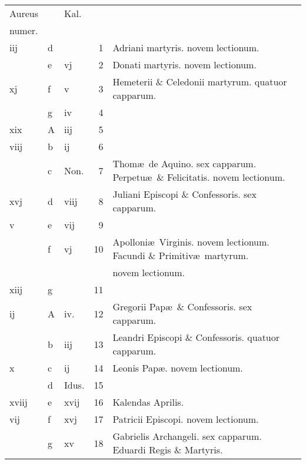 \documentclass[letter,11pt]{book}
\begin{document}
\begin{center}
\begin{tabular}{l | l | l | r | l}
\color{Red}Aureus & & \color{Red} Kal. & \\
\color{Red}numer. & & & \\
\color{Red} iij & d & & 1 & Adriani martyris. \color{Red} novem lectionum. \\
\color{Red}  & e & \color{Red} vj & 2 & Donati martyris. \color{Red} novem lectionum. \\
\color{Red} xj & f & \color{Red} v & 3 & Hemeterii \& Celedonii martyrum. \color{Red} quatuor capparum. \\
\color{Red}  & g & \color{Red} iv & 4 & \\
\color{Red} xix & \color{Red} A & \color{Red} iij & 5 & \\
\color{Red} viij & b & \color{Red} ij & 6 & \\
\color{Red}  & c & Non. & 7 & Thom\ae \ de Aquino. \color{Red} sex capparum. \color{black} Perpetu\ae \ \& Felicitatis. \color{Red} novem lectionum. \\
\color{Red} xvj & d & \color{Red} viij & 8 & Juliani Episcopi \& Confessoris. \color{Red} sex capparum. \\
\color{Red} v & e & \color{Red} vij & 9 & \\
\color{Red}  & f & \color{Red} vj & 10 & Apolloni\ae \ Virginis. \color{Red} novem lectionum. \color{black} Facundi \& Primitiv\ae \ martyrum. \\
 &  &  &  & \quad \color{Red} novem lectionum. \\
\color{Red} xiij & g & & 11 & \\%
\color{Red} ij & \color{Red} A & \color{Red} iv. & 12 & Gregorii Pap\ae \ \& Confessoris. \color{Red} sex capparum. \\
\color{Red}  & b & \color{Red} iij & 13 & Leandri Episcopi \& Confessoris. \color{Red} quatuor capparum. \\
\color{Red} x & c & \color{Red} ij & 14 & Leonis Pap\ae . \color{Red} novem lectionum. \\
\color{Red}  & d & Idus. & 15 & \\
\color{Red} xviij & e & \color{Red} xvij & 16 & \qquad \color{Red} Kalendas Aprilis. \\
\color{Red} vij & f & \color{Red} xvj & 17 & Patricii Episcopi. \color{Red} novem lectionum. \\%
\color{Red}  & g & \color{Red} xv & 18 & Gabrielis Archangeli. \color{Red} sex capparum. \color{black} Eduardi Regis \& Martyris. \\

\end{tabular}
\end{center}
\end{document}
